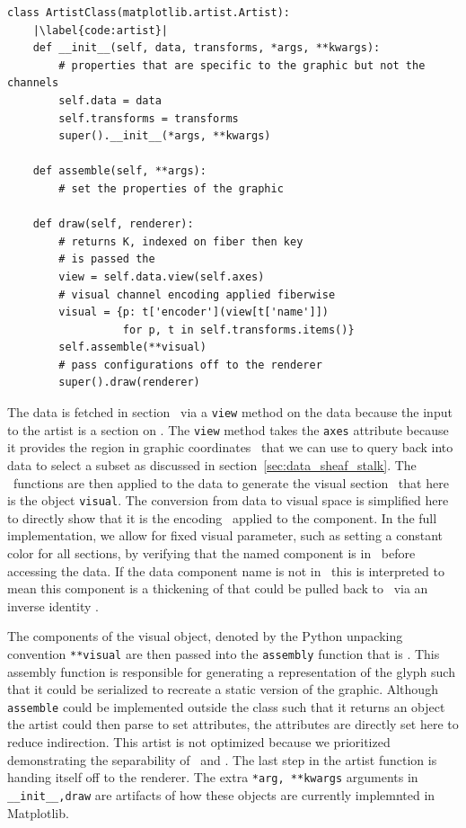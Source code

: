 \documentclass[../main.tex]{subfiles}
\begin{document}
\begin{verbatim}
class ArtistClass(matplotlib.artist.Artist):
    |\label{code:artist}|
    def __init__(self, data, transforms, *args, **kwargs):
        # properties that are specific to the graphic but not the channels
        self.data = data 
        self.transforms = transforms
        super().__init__(*args, **kwargs)

    def assemble(self, **args):
        # set the properties of the graphic

    def draw(self, renderer):
        # returns K, indexed on fiber then key 
        # is passed the 
        view = self.data.view(self.axes) 
        # visual channel encoding applied fiberwise 
        visual = {p: t['encoder'](view[t['name']])
                  for p, t in self.transforms.items()}
        self.assemble(**visual)
        # pass configurations off to the renderer
        super().draw(renderer)
\end{verbatim}

The data is fetched in section \dsection\ via a \texttt{view} method on the data because the input to the artist is a section on \dtotal. The \texttt{view} method takes the \texttt{axes} attribute because it provides the region in graphic coordinates \gbase\ that we can use to query back into data to select a subset as discussed in section~\ref{sec:data_sheaf_stalk}. The \vchannel\ functions are then applied to the data to generate the visual section \vsection\ that here is the object \texttt{visual}. The conversion from data to visual space is simplified here to directly show that it is the encoding \vchannel\ applied to the component. In the full implementation, we allow for fixed visual parameter, such as setting a constant color for all sections, by verifying that the named component is in \dfiber\ before accessing the data. If the data component name is not in \dfiber\, this is interpreted to mean this component is a thickening of \vtotal that could be pulled back to \dtotal\ via an inverse identity \vchannel. 

The components of the visual object, denoted by the Python unpacking convention \texttt{**visual} are then passed into the \texttt{assembly} function that is \vmarkd. This assembly function is responsible for generating a representation of the glyph such that it could be serialized to recreate a static version of the graphic. Although \texttt{assemble} could be implemented outside the class such that it returns an object the artist could then parse to set attributes, the attributes are directly set here to reduce indirection. This artist is not optimized because we prioritized demonstrating the separability of \vchannel\ and \vmarkd. The last step in the artist function is handing itself off to the renderer. The extra \texttt{*arg, **kwargs} arguments in \texttt{__init__,draw} are artifacts of how these objects are currently implemnted in Matplotlib. 
\end{document}
